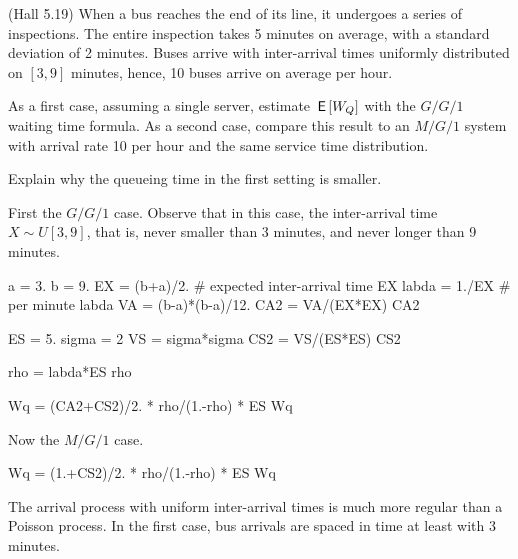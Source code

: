 \begin{exercise}
  (Hall 5.19) When a bus reaches the end of its line, it undergoes a series of inspections.
  The entire inspection takes 5 minutes on average, with a standard deviation of 2 minutes.
  Buses arrive with inter-arrival times uniformly distributed on $[3,9]$ minutes, hence, 10 buses arrive on average per hour.

  As a first case, assuming a single server, estimate $\,\mathsf{E}\left[W_Q\right]$ with the $G/G/1$ waiting time formula.
  As a second case, compare this result to an $M/G/1$ system with arrival rate 10 per hour and the same service time distribution.

  Explain why the queueing time in the first setting is smaller.
\begin{solution}
First the $G/G/1$ case. Observe that in this case, the inter-arrival time $X\sim U[3,9]$, that is, never smaller than 3 minutes, and never longer than 9 minutes. 

\begin{pyconsole}
a = 3.
b = 9. 
EX = (b+a)/2. # expected inter-arrival time
EX
labda = 1./EX # per minute
labda
VA = (b-a)*(b-a)/12.
CA2 = VA/(EX*EX)
CA2

ES = 5.
sigma = 2
VS = sigma*sigma
CS2 = VS/(ES*ES)
CS2

rho = labda*ES
rho

Wq = (CA2+CS2)/2. * rho/(1.-rho) * ES
Wq
\end{pyconsole}

Now the $M/G/1$ case.

\begin{pyconsole}
Wq = (1.+CS2)/2. * rho/(1.-rho) * ES
Wq
\end{pyconsole}

The arrival process with uniform inter-arrival times is much more regular than a Poisson process.
In the first case, bus arrivals are spaced in time at least with 3 minutes.
\end{solution}
\end{exercise}


